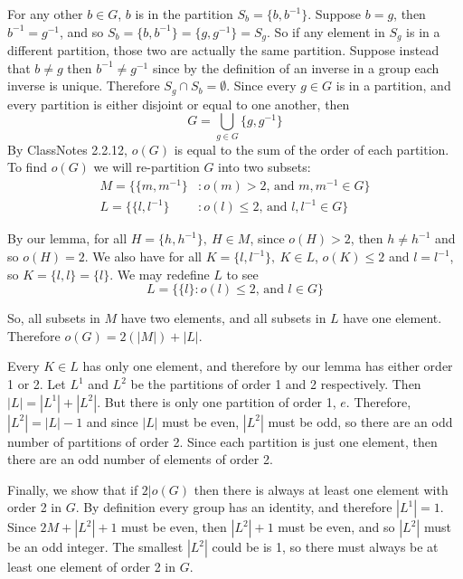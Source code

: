 \documentclass[letterpaper]{article}
\begin{document}
\begin{itemize}
            For any other \(b \in G\), \(b\) is in the partition \(S_b = \{b, b^{-1}\}\). Suppose \(b = g\), then \(b^{-1} = g^{-1}\), and so \(S_b = \{b, b^{-1}\} = \{g, g^{-1}\} = S_g\). So if any element in \(S_g\) is in a different partition, those two are actually the same partition. Suppose instead that \(b \neq g\) then \(b^{-1} \neq g^{-1}\) since by the definition of an inverse in a group each inverse is unique. Therefore \(S_g \cap S_b = \emptyset\). Since every \(g \in G\) is in a partition, and every partition is either disjoint or equal to one another, then \[G = \bigcup_{g \in G}{\{g, g^{-1}\}}\]
            By ClassNotes 2.2.12, \(o(G)\) is equal to the sum of the order of each partition. To find \(o(G)\) we will re-partition \(G\) into two subsets:
            \begin{align*}
                  M = \{\{m, m^{-1}\} & : o(m) > 2\text{, and } m, m^{-1} \in G\}    \\
                  L = \{\{l, l^{-1}\} & : o(l) \leq 2\text{, and } l, l^{-1} \in G\}
            \end{align*}

            By our lemma, for all \(H = \{h, h^{-1}\},\  H \in M\), since \(o(H) > 2\), then \(h \neq h^{-1}\) and so \(o(H) = 2\). We also have for all \(K = \{l , l^{-1}\},\ K \in L\), \(o(K) \leq 2\) and \(l = l^{-1}\), so \(K = \{l, l\} = \{l\}\). We may redefine \(L\) to see
            \[L = \{\{l\} : o(l) \leq 2\text{, and } l \in G\}\]

            So, all subsets in \(M\) have two elements, and all subsets in \(L\) have one element. Therefore \(o(G) = 2(|M|) + |L|\).

            Every \(K \in L\) has only one element, and therefore by our lemma has either order 1 or 2. Let \(L^1\) and \(L^2\) be the partitions of order 1 and 2 respectively.  Then \(|L| = |L^1| + |L^2|\).  But there is only one partition of order 1, \({e}\). Therefore, \(|L^2| = |L| - 1\) and since \(|L|\) must be even, \(|L^2|\) must be odd, so there are an odd number of partitions of order 2. Since each partition is just one element, then there are an odd number of elements of order 2.

            Finally, we show that if \(2|o(G)\) then there is always at least one element with order 2 in \(G\). By definition every group has an identity, and therefore \(|L^1| = 1\). Since \(2M + |L^2| + 1\) must be even, then \(|L^2| + 1\) must be even, and so \(|L^2|\) must be an odd integer. The smallest \(|L^2|\) could be is 1, so there must always be at least one element of order 2 in \(G\).


\end{itemize}
\end{document}

